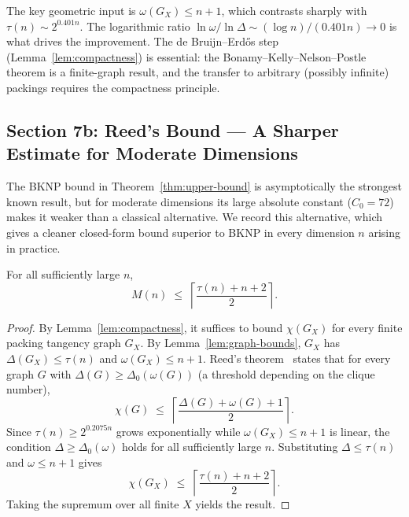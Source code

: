\begin{remark}
The key geometric input is $\omega(G_X)\le n+1$, which contrasts sharply with $\tau(n)\sim 2^{0.401n}$.  The logarithmic ratio $\ln\omega/\ln\Delta\sim (\log n)/(0.401n)\to 0$ is what drives the improvement.  The de Bruijn--Erd\H{o}s step (Lemma~\ref{lem:compactness}) is essential: the Bonamy--Kelly--Nelson--Postle theorem is a finite-graph result, and the transfer to arbitrary (possibly infinite) packings requires the compactness principle.
\end{remark}

\subsection*{Section 7b: Reed's Bound — A Sharper Estimate for Moderate Dimensions}

The BKNP bound in Theorem~\ref{thm:upper-bound} is asymptotically the strongest known result, but for moderate dimensions its large absolute constant ($C_0 = 72$) makes it weaker than a classical alternative.  We record this alternative, which gives a cleaner closed-form bound superior to BKNP in every dimension $n$ arising in practice.

\begin{theorem}\label{thm:reed}
For all sufficiently large $n$,
\[
  M(n) \;\le\; \left\lceil\frac{\tau(n)+n+2}{2}\right\rceil.
\]
\end{theorem}

\begin{proof}
By Lemma~\ref{lem:compactness}, it suffices to bound $\chi(G_X)$ for every finite packing tangency graph $G_X$.  By Lemma~\ref{lem:graph-bounds}, $G_X$ has $\Delta(G_X)\le\tau(n)$ and $\omega(G_X)\le n+1$.  Reed's theorem~\cite{Reed1998} states that for every graph $G$ with $\Delta(G)\ge\Delta_0(\omega(G))$ (a threshold depending on the clique number),
\[
  \chi(G)\;\le\;\left\lceil\frac{\Delta(G)+\omega(G)+1}{2}\right\rceil.
\]
Since $\tau(n)\ge 2^{0.2075n}$ grows exponentially while $\omega(G_X)\le n+1$ is linear, the condition $\Delta\ge\Delta_0(\omega)$ holds for all sufficiently large $n$.  Substituting $\Delta\le\tau(n)$ and $\omega\le n+1$ gives
\[
  \chi(G_X)\;\le\;\left\lceil\frac{\tau(n)+n+2}{2}\right\rceil.
\]
Taking the supremum over all finite $X$ yields the result.
\end{proof}

